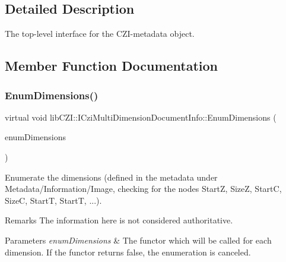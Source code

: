 \subsection{Detailed Description}
The top-\/level interface for the C\+Z\+I-\/metadata object. 

\subsection{Member Function Documentation}
\mbox{\label{classlib_c_z_i_1_1_i_czi_multi_dimension_document_info_a23f7b26bd323732fac0d190e9b38b6e3}} 
\subsubsection{\texorpdfstring{Enum\+Dimensions()}{EnumDimensions()}}
{\footnotesize\ttfamily virtual void lib\+C\+Z\+I\+::\+I\+Czi\+Multi\+Dimension\+Document\+Info\+::\+Enum\+Dimensions (\begin{DoxyParamCaption}\item[{std\+::function$<$ bool(\hyperlink{namespacelib_c_z_i_a55049658acf59d0eddfaebcad16df424}{Dimension\+Index})$>$}]{enum\+Dimensions }\end{DoxyParamCaption})\hspace{0.3cm}{\ttfamily [pure virtual]}}

Enumerate the dimensions (defined in the metadata under Metadata/\+Information/\+Image, checking for the nodes StartZ, SizeZ, StartC, SizeC, StartT, StartT, ...). \begin{DoxyRemark}{Remarks}
The information here is not considered authoritative. 
\end{DoxyRemark}

\begin{DoxyParams}{Parameters}
{\em enum\+Dimensions} & The functor which will be called for each dimension. If the functor returns false, the enumeration is canceled. \\
\hline
\end{DoxyParams}
\mbox{\label{classlib_c_z_i_1_1_i_czi_multi_dimension_document_info_a1e5d72c39dc22f99e1ee27b21055d3ea}} 
